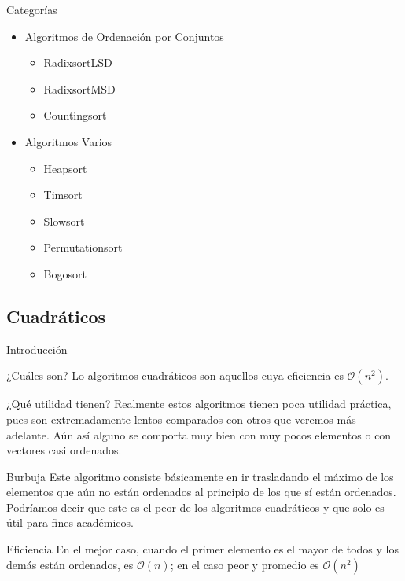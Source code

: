\documentclass[compress]{beamer}
\begin{document}
\begin{frame}{Categorías}
	\begin{itemize}
	\item Algoritmos de Ordenación por Conjuntos\\
		\begin{itemize}
		\item RadixsortLSD
		\item RadixsortMSD
		\item Countingsort
		\end{itemize}
	\item Algoritmos Varios\\
		\begin{itemize}
		\item Heapsort
		\item Timsort
		\item Slowsort
		\item Permutationsort
		\item Bogosort
		\end{itemize}
	\end{itemize}
\end{frame}

\subsection{Cuadráticos}

\begin{frame}{Introducción}
	\begin{block}{¿Cuáles son?}
	Lo algoritmos cuadráticos son aquellos cuya eficiencia es $\mathcal{O}(n^2)$.
	\end{block}
\vspace{0.20in}
	\begin{block}{¿Qué utilidad tienen?}
	Realmente estos algoritmos tienen poca utilidad práctica, pues son extremadamente lentos comparados con otros que veremos más adelante. Aún así alguno se comporta muy bien con muy pocos elementos o con vectores casi ordenados.
	\end{block}
\end{frame}

\begin{frame}{Burbuja}
Este algoritmo consiste básicamente en ir trasladando el máximo de los elementos que aún no están ordenados al principio de los que sí están ordenados.\\
\vspace{0.20in}
Podríamos decir que este es el peor de los algoritmos cuadráticos y que solo es útil para fines académicos.\\
\vspace{0.20in}
	\begin{block}{Eficiencia}
	En el mejor caso, cuando el primer elemento es el mayor de todos y los demás están ordenados, es $\mathcal{O}(n)$; en el caso peor y promedio es $\mathcal{O}(n^2)$
	\end{block}
\end{frame}
\end{document}
